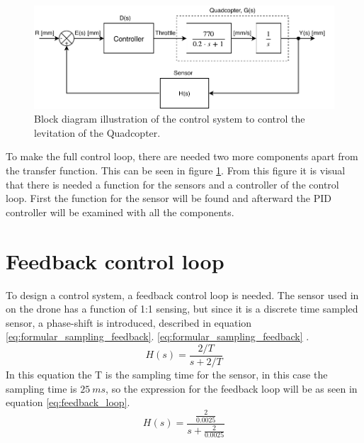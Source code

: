  \begin{figure}[H]
     \centering
     \includegraphics[width=\textwidth]{figures/ch_design/controller/ControlDiagramTF.pdf}
     \caption{Block diagram illustration of the control system  to control the levitation of the Quadcopter.}
     \label{fig:controlDiagram}
 \end{figure}

To make the full control loop, there are needed two more components apart from the transfer function. This can be seen in figure \ref{fig:controlDiagram}. From this figure it is visual that there is needed a function for the sensors and a controller of the control loop. 
First the function for the sensor will be found and afterward the PID controller will be examined with all the components.


\section{Feedback control loop}\label{s:feedback_loop}
To design a control system, a feedback control loop is needed. The sensor used in on the drone has a function of 1:1 sensing, but since it is a discrete time sampled sensor, a phase-shift is introduced, described in equation \ref{eq:formular_sampling_feedback}. \ref{eq:formular_sampling_feedback} \cite{digital_control}.
\begin{equation}\label{eq:formular_sampling_feedback}
    H(s)=\frac{2/T}{s+2/T}
\end{equation}
In this equation the T is the sampling time for the sensor, in this case the sampling time is $25\ ms$, so the expression for the feedback loop will be as seen in equation \ref{eq:feedback_loop}\cite{feedback_control}.
\begin{equation}\label{eq:feedback_loop}
    H(s)=\frac{\frac{2}{0.0025}}{s+\frac{2}{0.0025}}
\end{equation}

